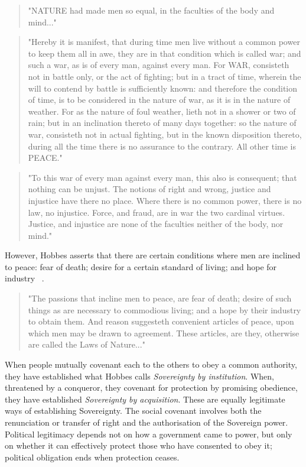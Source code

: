 \documentclass[11pt, oneside]{book}   	%
\begin{document}
\begin{quote}
"NATURE had made men so equal, in the faculties of the body and mind..."
\end{quote}
\begin{quote}
"Hereby it is manifest, that during time men live without a common power to keep them all in awe, they are in that condition which is called war; and such a war, as is of every man, against every man. For WAR, consisteth not in battle only, or the act of fighting; but in a tract of time, wherein the will to contend by battle is sufficiently known: and therefore the condition of time, is to be considered in the nature of war, as it is in the nature of weather. For as the nature of foul weather, lieth not in a shower or two of rain; but in an inclination thereto of many days together: so the nature of war, consisteth not in actual fighting, but in the known disposition thereto, during all the time there is no assurance to the contrary. All other time is PEACE."
\end{quote}
\begin{quote}
"To this war of every man against every man, this also is consequent; that nothing can be unjust. The notions of right and wrong, justice and injustice have there no place. Where there is no common power, there is no law, no injustice. Force, and fraud, are in war the two cardinal virtues. Justice, and injustice are none of the faculties neither of the body, nor mind."
\end{quote}

However, Hobbes asserts that there are certain conditions where men are inclined to peace: fear of death; desire for a certain standard of living; and hope for industry ~\cite{th1}.

\begin{quote}
"The passions that incline men to peace, are fear of death; desire of such things as are necessary to commodious living; and a hope by their industry to obtain them. And reason suggesteth convenient articles of peace, upon which men may be drawn to agreement. These articles, are they, otherwise are called the Laws of Nature..."
\end{quote}

When people mutually covenant each to the others to obey a common authority, they have established what Hobbes calls \emph{Sovereignty by institution}. When, threatened by a conqueror, they covenant for protection by promising obedience, they have established \emph{Sovereignty by acquisition}. These are equally legitimate ways of establishing Sovereignty. The social covenant involves both the renunciation or transfer of right and the authorisation of the Sovereign power. Political legitimacy depends not on how a government came to power, but only on whether it can effectively protect those who have consented to obey it; political obligation ends when protection ceases.\par
\end{document}
